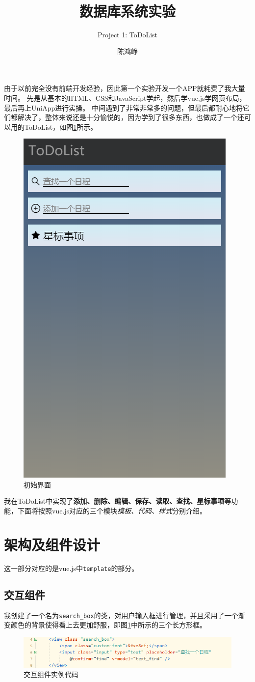 \documentclass[logo,reportComp]{thesis}
\title{数据库系统实验}
\subtitle{Project 1: ToDoList}
\author{陈鸿峥}
\begin{document}
\maketitle


由于以前完全没有前端开发经验，因此第一个实验开发一个APP就耗费了我大量时间。
先是从基本的HTML、CSS和JavaScript学起，然后学vue.js学网页布局，最后再上UniApp进行实操。
中间遇到了非常非常多的问题，但最后都耐心地将它们都解决了，整体来说还是十分愉悦的，因为学到了很多东西，也做成了一个还可以用的ToDoList，如图\ref{fig:ini}所示。
\begin{figure}[H]
\centering
\includegraphics[width=0.4\linewidth]{fig/main.png}
\caption{初始界面}
\label{fig:ini}
\end{figure}

我在ToDoList中实现了\textbf{添加、删除、编辑、保存、读取、查找、星标事项}等功能，下面将按照vue.js对应的三个模块\emph{模板、代码、样式}分别介绍。

\section{架构及组件设计}
这一部分对应的是vue.js中\verb'template'的部分。

\subsection{交互组件}
我创建了一个名为\verb'search_box'的类，对用户输入框进行管理，并且采用了一个渐变颜色的背景使得看上去更加舒服，即图\ref{fig:ini}中所示的三个长方形框。
\begin{figure}[H]
\centering
\includegraphics[width=0.8\linewidth]{fig/search_box.png}
\caption{交互组件实例代码}
\label{fig:interactive}
\end{figure}
\end{document}
